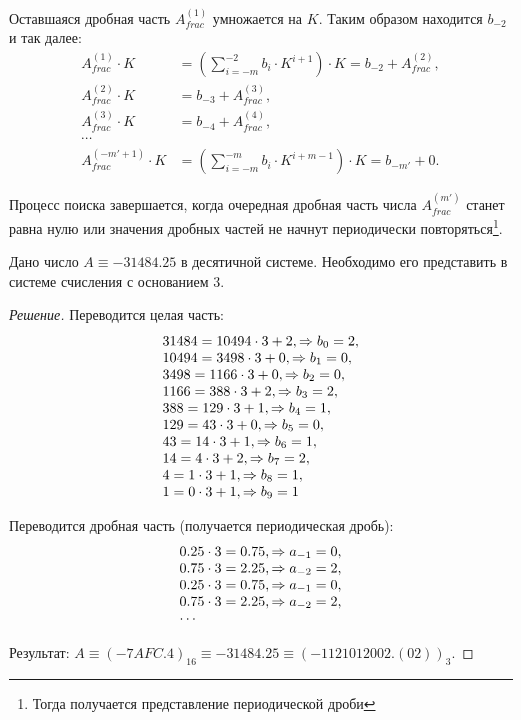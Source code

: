 Оставшаяся дробная часть $A_{frac}^{(1)}$ умножается на $K$. Таким образом находится $b_{-2}$ и так далее:
\begin{align*}
    \displaystyle
    A_{frac}^{(1)}\cdot K &= \left(\sum_{i=-m}^{-2}b_i\cdot K^{i+1} \right)\cdot K = b_{-2} + A_{frac}^{(2)},\\
    A_{frac}^{(2)}\cdot K &= b_{-3} + A_{frac}^{(3)},\\
    A_{frac}^{(3)}\cdot K &= b_{-4} + A_{frac}^{(4)},\\
    \cdots \\
    A_{frac}^{(-m'+1)}\cdot K &= \left(\sum_{i=-m}^{-m}b_i\cdot K^{i+m-1} \right)\cdot K = b_{-m'} + 0.
\end{align*}

Процесс поиска завершается, когда очередная дробная часть числа $A_{frac}^{(m')}$ станет равна нулю или значения дробных частей не начнут периодически повторяться\footnote{Тогда получается представление периодической дроби}.

\begin{exampl}[Задача]
    Дано число $A\equiv-31484.25$ в десятичной системе. Необходимо его представить в системе счисления с основанием $3$.
\end{exampl}
\begin{proof}[Решение]
    Переводится целая часть:
    \[
        \begin{array}[c]{l}
            31484=10494\cdot 3 + 2,\Rightarrow b_{0}=2, \\
            10494=3498\cdot 3 + 0,\Rightarrow b_{1}=0, \\
            3498=1166\cdot 3 + 0,\Rightarrow b_{2}=0, \\
            1166=388\cdot 3 + 2,\Rightarrow b_{3}=2, \\
            388=129\cdot 3 + 1,\Rightarrow b_{4}=1, \\
            129=43\cdot 3 + 0,\Rightarrow b_{5}=0, \\
            43=14\cdot 3 + 1,\Rightarrow b_{6}=1, \\
            14=4\cdot 3 + 2,\Rightarrow b_{7}=2, \\
            4=1\cdot 3 + 1,\Rightarrow b_{8}=1, \\
            1=0\cdot 3 + 1,\Rightarrow b_{9}=1
        \end{array}
    \]

    Переводится дробная часть (получается периодическая дробь):
    \[
    \begin{array}[c]{l}
        0.25\cdot 3=0.75,\Rightarrow a_{-1}=0, \\
        0.75\cdot 3=2.25,\Rightarrow a_{-2}=2, \\
        0.25\cdot 3=0.75,\Rightarrow a_{-1}=0, \\
        0.75\cdot 3=2.25,\Rightarrow a_{-2}=2, \\
        \cdots
    \end{array}
    \]

    Результат: $A\equiv(-7AFC.4)_{16}\equiv -31484.25 \equiv (-1121012002.(02))_{3}$.
\end{proof}

